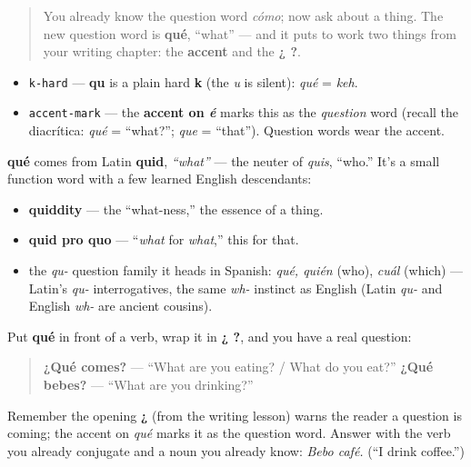 \label{lesson:ES-C07-que}



\begin{quote}
You already know the question word \emph{cómo}; now ask about a thing. The new question word is \textbf{qué}, \textquotedblleft{}what\textquotedblright{} — and it puts to work two things from your writing chapter: the \textbf{accent} and the \textbf{¿ ?}.
\end{quote}

\begin{sounds}
\begin{itemize}
\raggedright
  \item \texttt{k-hard} — \textbf{qu} is a plain hard \textbf{k} (the \emph{u} is silent): \emph{qué} = \emph{keh}.
  \item \texttt{accent-mark} — the \textbf{accent on \emph{é}} marks this as the \emph{question} word (recall the diacrítica: \emph{qué} = \textquotedblleft{}what?\textquotedblright{}; \emph{que} = \textquotedblleft{}that\textquotedblright{}). Question words wear the accent.
\end{itemize}
\end{sounds}

\begin{cousinweb}
\textbf{qué} comes from Latin \textbf{quid}, \emph{\textquotedblleft{}what\textquotedblright{}} — the neuter of \emph{quis}, \textquotedblleft{}who.\textquotedblright{} It's a small function word with a few learned English descendants:

\begin{itemize}
\raggedright
  \item \textbf{quiddity} — the \textquotedblleft{}what-ness,\textquotedblright{} the essence of a thing.
  \item \textbf{quid pro quo} — \textquotedblleft{}\emph{what} for \emph{what},\textquotedblright{} this for that.
  \item the \emph{qu-} question family it heads in Spanish: \emph{qué, quién} (who), \emph{cuál} (which) — Latin's \emph{qu-} interrogatives, the same \emph{wh-} instinct as English (Latin \emph{qu-} and English \emph{wh-} are ancient cousins).
\end{itemize}
\end{cousinweb}

\begin{grammarlens}[title={Grammar Lens: asking with a verb you know}]
Put \textbf{qué} in front of a verb, wrap it in \textbf{¿ ?}, and you have a real question:

\begin{quote}
\textbf{¿Qué comes?} — \textquotedblleft{}What are you eating? / What do you eat?\textquotedblright{} \textbf{¿Qué bebes?} — \textquotedblleft{}What are you drinking?\textquotedblright{}
\end{quote}

Remember the opening \textbf{¿} (from the writing lesson) warns the reader a question is coming; the accent on \emph{qué} marks it as the question word. Answer with the verb you already conjugate and a noun you already know: \emph{Bebo café.} (\textquotedblleft{}I drink coffee.\textquotedblright{})
\end{grammarlens}

